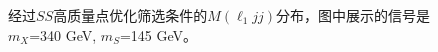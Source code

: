 \begin{figure}[h]
\begin{minipage}[t]{0.33\linewidth}
 \end{minipage}
  \caption{经过$SS$高质量点优化筛选条件的$M(\ell_{1}jj)$分布，图中展示的信号是$m_X$=340 GeV, $m_S$=145 GeV。}
\label{fig:SigOpt:H340_S165_m_l1jj.pdf}
\end{figure}
